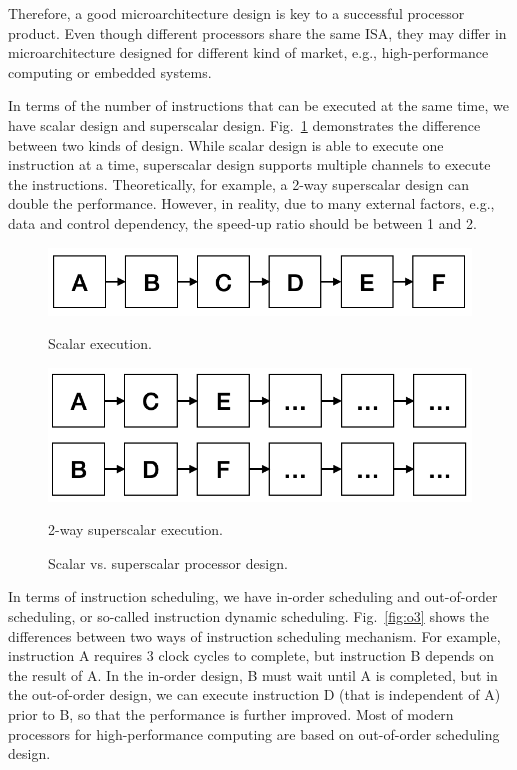 Therefore, a good microarchitecture design is key to a successful processor product. Even though different processors share the same ISA, they may differ in microarchitecture designed for different kind of market, e.g., high-performance computing or embedded systems.

In terms of the number of instructions that can be executed at the same time, we have scalar design and superscalar design. Fig.~\ref{fig:superscalar} demonstrates the difference between two kinds of design. While scalar design is able to execute one instruction at a time, superscalar design supports multiple channels to execute the instructions. Theoretically, for example, a 2-way superscalar design can double the performance. However, in reality, due to many external factors, e.g., data and control dependency, the speed-up ratio should be between 1 and 2.

\begin{figure}[!htp]
  \begin{minipage}{0.4\textwidth}
      \centering
      \includegraphics[width=\textwidth]{figure/scalar.png}
      \caption{Scalar execution.}
      \label{fig:superscalar-1}
  \end{minipage}\hfill
  \begin{minipage}{0.4\textwidth}
      \centering
      \includegraphics[width=\textwidth]{figure/superscalar.png}
      \caption{2-way superscalar execution.}
      \label{fig:superscalar-2}
  \end{minipage}
  \caption{Scalar vs. superscalar processor design.}
  \label{fig:superscalar}
\end{figure}

In terms of instruction scheduling, we have in-order scheduling and out-of-order scheduling, or so-called instruction dynamic scheduling. Fig.~\ref{fig:o3} shows the differences between two ways of instruction scheduling mechanism. For example, instruction A requires 3 clock cycles to complete, but instruction B depends on the result of A. In the in-order design, B must wait until A is completed, but in the out-of-order design, we can execute instruction D (that is independent of A) prior to B, so that the performance is further improved. Most of modern processors for high-performance computing are based on out-of-order scheduling design.

